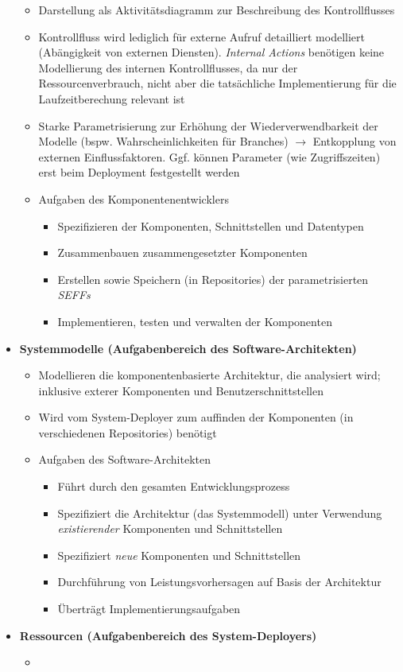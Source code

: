 \begin{itemize}
\begin{itemize}
		\item Darstellung als Aktivitätsdiagramm zur Beschreibung des Kontrollflusses
		\item Kontrollfluss wird lediglich für externe Aufruf detailliert modelliert (Abängigkeit von externen Diensten). \textit{Internal Actions} benötigen keine Modellierung des internen Kontrollflusses, da nur der Ressourcenverbrauch, nicht aber die tatsächliche Implementierung für die Laufzeitberechung relevant ist
		\item Starke Parametrisierung zur Erhöhung der Wiederverwendbarkeit der Modelle (bspw. Wahrscheinlichkeiten für Branches) \(\rightarrow\) Entkopplung von externen Einflussfaktoren. Ggf. können Parameter (wie Zugriffszeiten) erst beim Deployment festgestellt werden
		\item Aufgaben des Komponentenentwicklers
		\begin{itemize}
			\item Spezifizieren der Komponenten, Schnittstellen und Datentypen
			\item Zusammenbauen zusammengesetzter Komponenten
			\item Erstellen sowie Speichern (in Repositories) der parametrisierten \textit{SEFFs}
			\item Implementieren, testen und verwalten der Komponenten
		\end{itemize}
	\end{itemize}
	\item \textbf{Systemmodelle (Aufgabenbereich des Software-Architekten)}
	\begin{itemize}
		\item Modellieren die komponentenbasierte Architektur, die analysiert wird; inklusive exterer Komponenten und Benutzerschnittstellen
		\item Wird vom System-Deployer zum auffinden der Komponenten (in verschiedenen Repositories) benötigt
		\item Aufgaben des Software-Architekten
		\begin{itemize}
			\item Führt durch den gesamten Entwicklungsprozess
			\item Spezifiziert die Architektur (das Systemmodell) unter Verwendung \textit{existierender} Komponenten und Schnittstellen
			\item Spezifiziert \textit{neue} Komponenten und Schnittstellen
			\item Durchführung von Leistungsvorhersagen auf Basis der Architektur
			\item Überträgt Implementierungsaufgaben
		\end{itemize}
	\end{itemize}
	\item \textbf{Ressourcen (Aufgabenbereich des System-Deployers)}
	\begin{itemize}
		\item
	\end{itemize}
\end{itemize}



